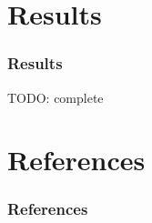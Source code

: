 \documentclass{beamer}
\begin{document}

\section{Results}

\begin{frame}
  \frametitle{Results}
  TODO: complete
\end{frame}


\section*{References}

\begin{frame}
  \frametitle{References}
  
  
\end{frame}
\end{document}
